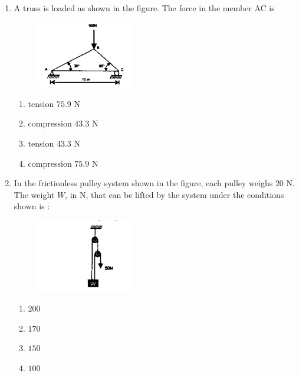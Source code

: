 \documentclass[journal,12pt,onecolumn]{IEEEtran}
\theoremstyle{remark}
\begin{document}
\begin{enumerate}
\hfill{}
\begin{multicols}{4}
\begin{enumerate}
\item $6030$
\item $5840$
\item $5750$
\item $5630$
\end{enumerate}
\end{multicols}

\item A truss is loaded as shown in the figure. The force in the member AC is

\hfill{}
\begin{figure}[H]
\centering
\includegraphics[width=0.4\textwidth]{figs/truss.png}    
\end{figure}
\begin{multicols}{2}
\begin{enumerate}
\item tension $75.9$ N
\item compression $43.3$ N
\item tension $43.3$ N
\item compression $75.9$ N
\end{enumerate}
\end{multicols}

\item In the frictionless pulley system shown in the figure, each pulley weighs $20$ N.  
The weight \( W \), in N, that can be lifted by the system under the conditions shown is $\colon$


\hfill{}

\begin{figure}[H]
\includegraphics[width=0.4\textwidth]{figs/pulley.png}
\end{figure}
\begin{multicols}{4}
\begin{enumerate}
\item $200$
\item $170$
\item $150$
\item $100$
\end{enumerate}
\end{multicols}


\end{enumerate}
\end{document}

